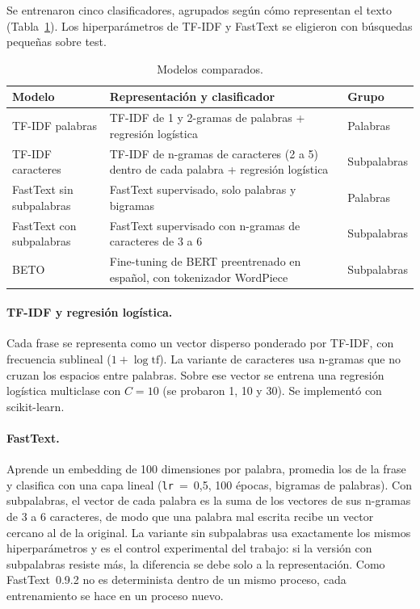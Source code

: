 \documentclass[11pt,a4paper]{article}
\newcommand{\cod}[1]{\texttt{#1}}
\begin{document}
Se entrenaron cinco clasificadores, agrupados según cómo representan el texto
(Tabla~\ref{tab:modelos}). Los hiperparámetros de TF-IDF y FastText se eligieron con búsquedas
pequeñas sobre test.

\begin{table}[H]
\centering
\small
\begin{tabular}{@{}l p{8.2cm} l@{}}
\toprule
Modelo & Representación y clasificador & Grupo \\
\midrule
TF-IDF palabras & TF-IDF de 1 y 2-gramas de palabras + regresión logística & Palabras \\
TF-IDF caracteres & TF-IDF de n-gramas de caracteres (2 a 5) dentro de cada palabra +
  regresión logística & Subpalabras \\
FastText sin subpalabras & FastText supervisado, solo palabras y bigramas & Palabras \\
FastText con subpalabras & FastText supervisado con n-gramas de caracteres de 3 a 6 &
  Subpalabras \\
BETO & Fine-tuning de BERT preentrenado en español, con tokenizador WordPiece & Subpalabras \\
\bottomrule
\end{tabular}
\caption{Modelos comparados.}
\label{tab:modelos}
\end{table}

\paragraph{TF-IDF y regresión logística.} Cada frase se representa como un vector disperso
ponderado por TF-IDF, con frecuencia sublineal
($1+\log \mathrm{tf}$). La variante de caracteres usa n-gramas que no cruzan los espacios entre
palabras. Sobre ese vector se entrena una regresión logística multiclase
con $C=10$ (se probaron 1, 10 y 30). Se implementó con
scikit-learn.

\paragraph{FastText.} Aprende un embedding de 100 dimensiones por palabra, promedia los de la
frase y clasifica con una capa lineal (\cod{lr}~=~0,5, 100 épocas, bigramas de palabras). Con
subpalabras, el vector de cada palabra es la suma de los vectores de sus n-gramas de 3 a 6
caracteres, de modo que una palabra mal escrita recibe un vector cercano al de la original.
La variante sin subpalabras usa exactamente los mismos hiperparámetros y es el control
experimental del trabajo: si la versión con subpalabras resiste más, la diferencia se debe
solo a la representación. Como FastText~0.9.2 no es determinista dentro de un mismo proceso,
cada entrenamiento se hace en un proceso nuevo.
\end{document}
